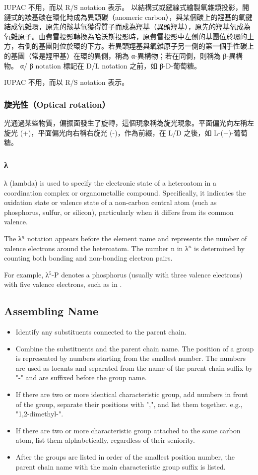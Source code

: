 \documentclass[a4paper,12pt]{report}
\begin{document}
IUPAC 不用，而以 R/S notation 表示。
以結構式或鍵線式繪製氧雜類投影，開鏈式的羰基碳在環化時成為異頭碳（anomeric carbon），與某個碳上的羥基的氧鍵結成氧雜環，原先的羰基氧獲得質子而成為羥基（異頭羥基），原先的羥基氧成為氧雜原子。由費雪投影轉換為哈沃斯投影時，原費雪投影中左側的基團位於環的上方，右側的基團則位於環的下方。若異頭羥基與氧雜原子另一側的第一個手性碳上的基團（常是羥甲基）在環的異側，稱為 α-異構物；若在同側，則稱為 β-異構物。 α/ β notation 標記在 D/L notation 之前，如 β-D-葡萄糖。

IUPAC 不用，而以 R/S notation 表示。
\subsubsection{旋光性（Optical rotation）}
光通過某些物質，偏振面發生了旋轉，這個現象稱為旋光現象。平面偏光向左稱左旋光 (+)，平面偏光向右稱右旋光 (-)，作為前綴，在 L/D 之後，如 L-(+)-葡萄糖。
\subsubsection{λ}
λ (lambda) is used to specify the electronic state of a heteroatom in a coordination complex or organometallic compound. Specifically, it indicates the oxidation state or valence state of a non-carbon central atom (such as phosphorus, sulfur, or silicon), particularly when it differs from its common valence.

The λ$^n$ notation appears before the element name and represents the number of valence electrons around the heteroatom. The number n in λ$^n$ is determined by counting both bonding and non-bonding electron pairs.

For example, λ$^5$-P denotes a phosphorus (usually with three valence electrons) with five valence electrons, such as in .
\subsection{Assembling Name}
\begin{itemize}
\item Identify any substituents connected to the parent chain.
\item Combine the substituents and the parent chain name. The position of a group is represented by numbers starting from the smallest number. The numbers are used as locants and separated from the name of the parent chain suffix by "-" and are suffixed before the group name.
\item If there are two or more identical characteristic group, add numbers in front of the group, separate their positions with ",", and list them together. e.g., "1,2-dimethyl-".
\item If there are two or more characteristic group attached to the same carbon atom, list them alphabetically, regardless of their seniority.
\item After the groups are listed in order of the smallest position number, the parent chain name with the main characteristic group suffix is listed.
\end{itemize}
\end{document}
